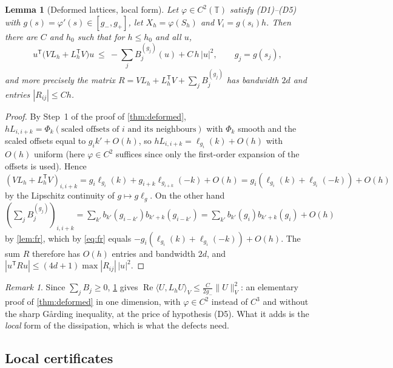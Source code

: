 \documentclass[11pt,a4paper]{article}
\theoremstyle{plain}
\newtheorem{lemma}[theorem]{Lemma}
\theoremstyle{definition}
\theoremstyle{remark}
\newtheorem{remark}[theorem]{Remark}
\numberwithin{equation}{section}
\newcommand{\T}{\mathbb{T}}
\renewcommand{\Re}{\operatorname{Re}}
\begin{document}
\begin{lemma}[Deformed lattices, local form]\label{lem:deformedsquares}
Let $\varphi\in C^2(\T)$ satisfy (D1)--(D5) with $g(s)=\varphi'(s)\in[g_-,g_+]$, let $X_h=\varphi(S_h)$ and $V_i=g(s_i)h$. Then there are $C$ and $h_0$ such that for $h\le h_0$ and all $u$,
\begin{equation}\label{eq:deformedsquares}
u^{\mathsf T}\big(VL_h+L_h^{\mathsf T}V\big)u\ \le\ -\sum_jB^{(g_j)}_j(u)+C\,h\,|u|^2,\qquad g_j=g(s_j),
\end{equation}
and more precisely the matrix $R=VL_h+L_h^{\mathsf T}V+\sum_jB_j^{(g_j)}$ has bandwidth $2d$ and entries $|R_{ij}|\le Ch$.
\end{lemma}

\begin{proof}
By Step~1 of the proof of \cref{thm:deformed}, $hL_{i,i+k}=\Phi_k(\text{scaled offsets of }i\text{ and its neighbours})$ with $\Phi_k$ smooth and the scaled offsets equal to $g_ik'+O(h)$, so $hL_{i,i+k}=\ell_{g_i}(k)+O(h)$ with $O(h)$ uniform (here $\varphi\in C^2$ suffices since only the first-order expansion of the offsets is used). Hence $(VL_h+L_h^{\mathsf T}V)_{i,i+k}=g_i\ell_{g_i}(k)+g_{i+k}\ell_{g_{i+k}}(-k)+O(h)=g_i(\ell_{g_i}(k)+\ell_{g_i}(-k))+O(h)$ by the Lipschitz continuity of $g\mapsto g\ell_g$. On the other hand $(\sum_jB_j^{(g_j)})_{i,i+k}=\sum_{k'}b_{k'}(g_{i-k'})b_{k'+k}(g_{i-k'})=\sum_{k'}b_{k'}(g_i)b_{k'+k}(g_i)+O(h)$ by \cref{lem:fr}, which by \eqref{eq:fr} equals $-g_i(\ell_{g_i}(k)+\ell_{g_i}(-k))+O(h)$. The sum $R$ therefore has $O(h)$ entries and bandwidth $2d$, and $|u^{\mathsf T}Ru|\le(4d+1)\max|R_{ij}|\,|u|^2$.
\end{proof}

\begin{remark}\label{rem:deformed1d}
Since $\sum_jB_j\ge0$, \cref{lem:deformedsquares} gives $\Re\langle U,L_hU\rangle_V\le\frac{C}{2g_-}\|U\|_V^2$: an elementary proof of \cref{thm:deformed} in one dimension, with $\varphi\in C^2$ instead of $C^3$ and without the sharp G{\aa}rding inequality, at the price of hypothesis (D5). What it adds is the \emph{local} form of the dissipation, which is what the defects need.
\end{remark}

\subsection{Local certificates}
\end{document}
